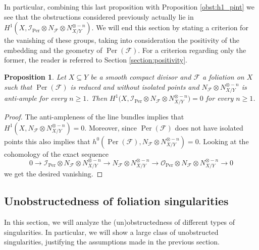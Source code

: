 \documentclass[reqno]{amsart}
\theoremstyle{plain}
\newcommand{\I}{\mathcal{I}}
\newcommand{\OO}{\mathcal{O}}
\renewcommand{\I}{\mathcal{I}}
\newcommand{\F}{\mathscr{F}}
\DeclareMathOperator{\Per}{Per}
\newtheorem{proposition}[theorem]{Proposition}
\theoremstyle{definition}
\theoremstyle{named}
\begin{document}
In particular, combining this last proposition with Proposition \ref{obst:h1_pint} we see that the obstructions considered previously actually lie in $H^1(X,\I_{\Per} \otimes N_\F\otimes N_{X/Y}^{\otimes - n})$. We will end this section by stating a criterion for the vanishing of these groups, taking into consideration the positivity of the embedding and the geometry of $\Per(\F)$. For a criterion regarding only the former, the reader is referred to Section \ref{section:positivity}.


\begin{proposition}
Let $X\subseteq Y$ be a smooth compact divisor and $\F$ a foliation on $X$ such that $\Per(\F)$ is reduced and without isolated points and $N_\F\otimes N_{X/Y}^{\otimes - n}$ is anti-ample for every $n\geqslant 1$. Then $H^1\big(X,\I_{\Per}\otimes N_\F\otimes N_{X/Y}^{\otimes -n}\big)=0$ for every $n\geqslant 1$.  
\end{proposition}
\begin{proof}
The anti-ampleness of the line bundles implies that $H^1(X,N_\F\otimes N_{X/Y}^{\otimes - n})=0$. Moreover, since $\Per(\F)$ does not have isolated points this also implies that $h^0(\Per(\F),N_\F\otimes N_{X/Y}^{\otimes - n})=0$. Looking at the cohomology of the exact sequence
$$ 0\rightarrow \I_{\Per}\otimes N_\F\otimes N_{X/Y}^{\otimes - n}\rightarrow N_\F\otimes N_{X/Y}^{\otimes - n}\rightarrow  \OO_{\Per}\otimes N_\F\otimes N_{X/Y}^{\otimes - n}\rightarrow 0$$
we get the desired vanishing.
\end{proof}

\subsection{Unobstructedness of foliation singularities} 
In this section, we will analyze the (un)obstructedness of different types of singularities. In particular, we will show a large class of unobstructed singularities, justifying the assumptions made in the previous section. 
\end{document}

